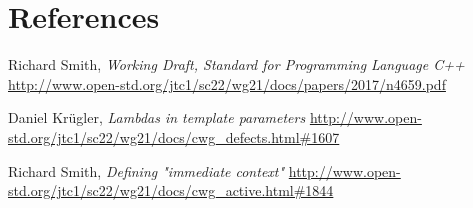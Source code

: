 \documentclass{wg21}
\begin{document}
\section{References}
\renewcommand{\section}[2]{}%
\begin{thebibliography}{9}

    Richard Smith,
    \emph{Working Draft, Standard for Programming Language C++}\newline
    \url{http://www.open-std.org/jtc1/sc22/wg21/docs/papers/2017/n4659.pdf}

    Daniel Kr{\"u}gler,
    \emph{Lambdas in template parameters}\newline
    \url{http://www.open-std.org/jtc1/sc22/wg21/docs/cwg_defects.html#1607}

    Richard Smith,
    \emph{Defining "immediate context"}\newline
    \url{http://www.open-std.org/jtc1/sc22/wg21/docs/cwg_active.html#1844}

\end{thebibliography}
\end{document}
